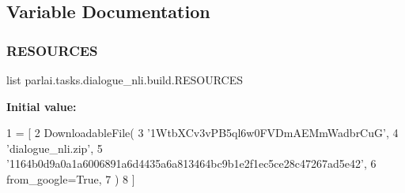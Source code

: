 \subsection{Variable Documentation}
\mbox{\label{namespaceparlai_1_1tasks_1_1dialogue__nli_1_1build_a2d6a9ea10c5e9897f090f380fde28e40}} 
\subsubsection{\texorpdfstring{R\+E\+S\+O\+U\+R\+C\+ES}{RESOURCES}}
{\footnotesize\ttfamily list parlai.\+tasks.\+dialogue\+\_\+nli.\+build.\+R\+E\+S\+O\+U\+R\+C\+ES}

{\bfseries Initial value\+:}
\begin{DoxyCode}
1 =  [
2     DownloadableFile(
3         \textcolor{stringliteral}{'1WtbXCv3vPB5ql6w0FVDmAEMmWadbrCuG'},
4         \textcolor{stringliteral}{'dialogue\_nli.zip'},
5         \textcolor{stringliteral}{'1164b0d9a0a1a6006891a6d4435a6a813464bc9b1e2f1ec5ce28c47267ad5e42'},
6         from\_google=\textcolor{keyword}{True},
7     )
8 ]
\end{DoxyCode}
